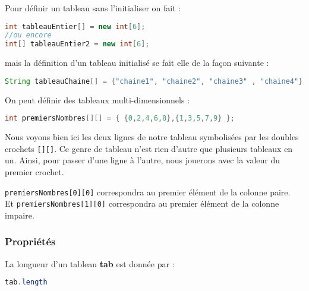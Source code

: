\documentclass[a4paper,twoside]{article}
\begin{document}
Pour définir un tableau sans l'initialiser on fait :
\begin{lstlisting}[language=java]
int tableauEntier[] = new int[6];
//ou encore
int[] tableauEntier2 = new int[6];
\end{lstlisting}
mais la définition d'un tableau initialisé se fait elle de la façon suivante :
\begin{lstlisting}[language=java]
String tableauChaine[] = {"chaine1", "chaine2", "chaine3" , "chaine4"};
\end{lstlisting}

\bigskip

On peut définir des tableaux multi-dimensionnels : 
\begin{lstlisting}[language=java]
int premiersNombres[][] = { {0,2,4,6,8},{1,3,5,7,9} };
\end{lstlisting}

Nous voyons bien ici les deux lignes de notre tableau symbolisées par les doubles crochets \texttt{[][]}. Ce genre de tableau n'est rien d'autre que plusieurs tableaux en un. Ainsi, pour passer d'une ligne à l'autre, nous jouerons avec la valeur du premier crochet.
\begin{exemple}
\verb|premiersNombres[0][0]| correspondra au premier élément de la colonne paire.\\
Et \verb|premiersNombres[1][0]| correspondra au premier élément de la colonne impaire.
\end{exemple}

\subsubsection{Propriétés}
La longueur d'un tableau \textbf{tab} est donnée par :
\begin{lstlisting}[language=java]
tab.length
\end{lstlisting}



\printindex
\end{document}
